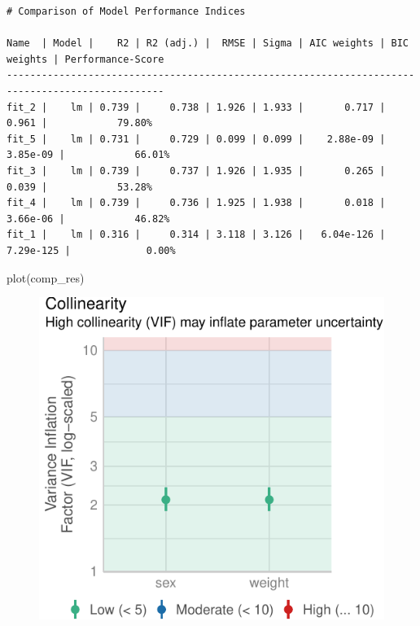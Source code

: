 \documentclass[
  letterpaper,
]{scrbook}
\newenvironment{Shaded}{\begin{snugshade}}{\end{snugshade}}
\newcommand{\FunctionTok}[1]{\textcolor[rgb]{0.28,0.35,0.67}{#1}}
\newcommand{\NormalTok}[1]{\textcolor[rgb]{0.00,0.23,0.31}{#1}}
\begin{document}
\begin{verbatim}
# Comparison of Model Performance Indices

Name  | Model |    R2 | R2 (adj.) |  RMSE | Sigma | AIC weights | BIC weights | Performance-Score
-------------------------------------------------------------------------------------------------
fit_2 |    lm | 0.739 |     0.738 | 1.926 | 1.933 |       0.717 |       0.961 |            79.80%
fit_5 |    lm | 0.731 |     0.729 | 0.099 | 0.099 |    2.88e-09 |    3.85e-09 |            66.01%
fit_3 |    lm | 0.739 |     0.737 | 1.926 | 1.935 |       0.265 |       0.039 |            53.28%
fit_4 |    lm | 0.739 |     0.736 | 1.925 | 1.938 |       0.018 |    3.66e-06 |            46.82%
fit_1 |    lm | 0.316 |     0.314 | 3.118 | 3.126 |   6.04e-126 |   7.29e-125 |             0.00%
\end{verbatim}

\begin{Shaded}
\begin{Highlighting}[]
\FunctionTok{plot}\NormalTok{(comp\_res)}
\end{Highlighting}
\end{Shaded}

\begin{figure}[H]

{\centering \includegraphics{./stat-modeling-basic_files/figure-pdf/unnamed-chunk-38-1.pdf}

}

\end{figure}
\end{document}

